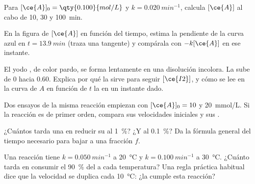 \begin{exercise}[$\star\star$]\label{exo:g12:reaction-rates:8}
Para $[\ce{A}]_0 = \qty{0.100}{mol/L}$ y $k = \qty{0.020}{min^{-1}}$,
calcula $[\ce{A}]$ al cabo de 10, 30 y \qty{100}{min}.
\end{exercise}

\begin{exercise}[$\star\star$]\label{exo:g12:reaction-rates:9}
En la figura de $[\ce{A}]$ en función del tiempo, estima la pendiente de
la curva azul en $t = \qty{13.9}{min}$ (traza una tangente) y compárala
con $-k[\ce{A}]$ en ese instante.
\end{exercise}

\begin{exercise}[$\star\star$]\label{exo:g12:reaction-rates:10}
El yodo , de color pardo, se forma lentamente en una disolución
incolora. La  sube de 0 hacia 0.60. Explica por qué la
 sirve para seguir $[\ce{I2}]$, y cómo se lee en la curva de
$A$ en función de $t$ la  en un instante dado.
\end{exercise}

\begin{exercise}[$\star\star$]\label{exo:g12:reaction-rates:11}
Dos ensayos de la misma reacción empiezan con $[\ce{A}]_0 = 10$ y
\qty{20}{mmol/L}. Si la reacción es de primer orden, compara sus
velocidades iniciales y sus .
\end{exercise}

\begin{exercise}[$\star\star\star$]\label{exo:g12:reaction-rates:12}
¿Cuántos  tarda una  en
reducir su  al \qty{1}{\percent}? ¿Y al \qty{0.1}{\percent}? Da
la fórmula general del tiempo necesario para bajar a una fracción $f$.
\end{exercise}

\begin{exercise}[$\star\star\star$]\label{exo:g12:reaction-rates:13}
Una reacción tiene $k = \qty{0.050}{min^{-1}}$ a \qty{20}{\celsius} y
$k = \qty{0.100}{min^{-1}}$ a \qty{30}{\celsius}. ¿Cuánto tarda en
consumir el \qty{90}{\percent} del  a cada temperatura? Una regla
práctica habitual dice que la velocidad se duplica cada
\qty{10}{\celsius}: ¿la cumple esta reacción?
\end{exercise}

